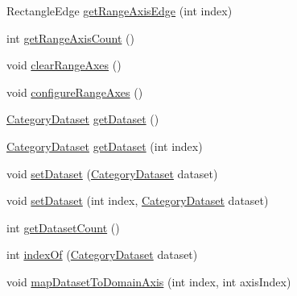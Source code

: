 \begin{DoxyCompactItemize}
\item 
Rectangle\+Edge \mbox{\hyperlink{classorg_1_1jfree_1_1chart_1_1plot_1_1_category_plot_aa0e7f350d90b1f27764cb9475244bfcc}{get\+Range\+Axis\+Edge}} (int index)
\item 
int \mbox{\hyperlink{classorg_1_1jfree_1_1chart_1_1plot_1_1_category_plot_a021eb16f86326be37cc8d1a8e08c539a}{get\+Range\+Axis\+Count}} ()
\item 
void \mbox{\hyperlink{classorg_1_1jfree_1_1chart_1_1plot_1_1_category_plot_ad934793e2dd46b04dd78d061e81054f5}{clear\+Range\+Axes}} ()
\item 
void \mbox{\hyperlink{classorg_1_1jfree_1_1chart_1_1plot_1_1_category_plot_a7c64bdc8e24ac670616ae0f3d138ea29}{configure\+Range\+Axes}} ()
\item 
\mbox{\hyperlink{interfaceorg_1_1jfree_1_1data_1_1category_1_1_category_dataset}{Category\+Dataset}} \mbox{\hyperlink{classorg_1_1jfree_1_1chart_1_1plot_1_1_category_plot_aef991a0f3a5792964fc797125f53601d}{get\+Dataset}} ()
\item 
\mbox{\hyperlink{interfaceorg_1_1jfree_1_1data_1_1category_1_1_category_dataset}{Category\+Dataset}} \mbox{\hyperlink{classorg_1_1jfree_1_1chart_1_1plot_1_1_category_plot_a2171d553581f0e3bcf252bad4464cb96}{get\+Dataset}} (int index)
\item 
void \mbox{\hyperlink{classorg_1_1jfree_1_1chart_1_1plot_1_1_category_plot_af0a9e40a0ddee18dc429c2e8b1199b53}{set\+Dataset}} (\mbox{\hyperlink{interfaceorg_1_1jfree_1_1data_1_1category_1_1_category_dataset}{Category\+Dataset}} dataset)
\item 
void \mbox{\hyperlink{classorg_1_1jfree_1_1chart_1_1plot_1_1_category_plot_adae0139eeab71b8c67ae9f7e219a9175}{set\+Dataset}} (int index, \mbox{\hyperlink{interfaceorg_1_1jfree_1_1data_1_1category_1_1_category_dataset}{Category\+Dataset}} dataset)
\item 
int \mbox{\hyperlink{classorg_1_1jfree_1_1chart_1_1plot_1_1_category_plot_a3dcfbbc2bb7c4243df4a41a4551553bd}{get\+Dataset\+Count}} ()
\item 
int \mbox{\hyperlink{classorg_1_1jfree_1_1chart_1_1plot_1_1_category_plot_a0c2d38ff3106e27c96b8cba527faf63e}{index\+Of}} (\mbox{\hyperlink{interfaceorg_1_1jfree_1_1data_1_1category_1_1_category_dataset}{Category\+Dataset}} dataset)
\item 
void \mbox{\hyperlink{classorg_1_1jfree_1_1chart_1_1plot_1_1_category_plot_acd6ce8e64e718ebc15642ca578012c26}{map\+Dataset\+To\+Domain\+Axis}} (int index, int axis\+Index)
\item 

\end{DoxyCompactItemize}
